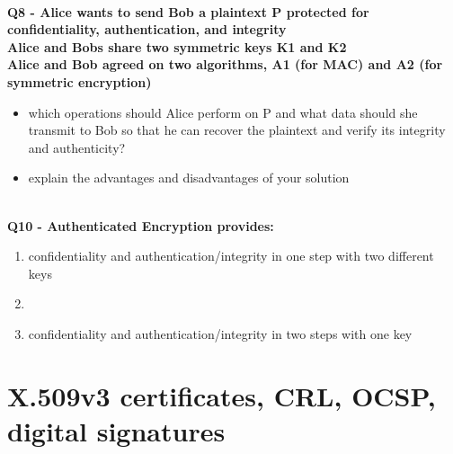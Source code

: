 \textbf{\\Q8 - Alice wants to send Bob a plaintext P protected for confidentiality, authentication, and integrity \\
	Alice and Bobs share two symmetric keys K1 and K2 \\
	Alice and Bob agreed on two algorithms, A1 (for MAC) and A2 (for symmetric encryption)}
\begin{itemize}
	\item which operations should Alice perform on P and what data
	      should she transmit to Bob so that he can recover the plaintext
	      and verify its integrity and authenticity?
	\item explain the advantages and disadvantages of your solution
\end{itemize}
\textbf{\\Q10  - Authenticated Encryption provides:}
\begin{enumerate}
	\item[A.] confidentiality and authentication/integrity in one step with two different keys
	\item[B.] 
	\item[C.] confidentiality and authentication/integrity in two steps with one key
\end{enumerate}




\section{X.509v3 certificates, CRL, OCSP, digital signatures}

